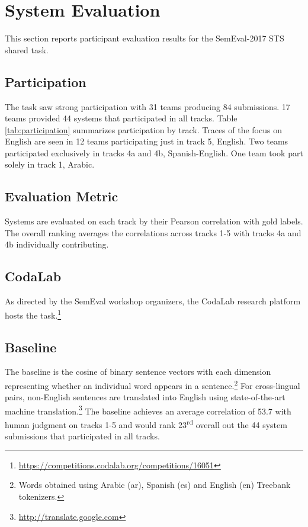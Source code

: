 \documentclass[11pt,a4paper]{article}
\begin{document}
\section{System Evaluation}

This section reports participant evaluation results for the SemEval-2017 STS shared task.

\subsection{Participation}

The task saw strong participation with 31 teams producing 84 submissions. 17 teams provided 44 systems that participated in all tracks. Table \ref{tab:participation} summarizes participation by track. Traces of the focus on English are seen in 12 teams participating just in track 5, English. Two teams participated exclusively in tracks 4a and 4b, Spanish-English. One team took part solely in track 1, Arabic.

\subsection{Evaluation Metric}

Systems are evaluated on each track by their Pearson correlation with gold labels. The overall ranking averages the correlations across tracks 1-5 with tracks 4a and 4b individually contributing.

\subsection{CodaLab}

As directed by the SemEval workshop organizers, the CodaLab research platform hosts the task.\footnote{\url{https://competitions.codalab.org/competitions/16051}}

\subsection{Baseline}
The baseline is the cosine of binary sentence vectors with each dimension representing whether an individual word appears in a sentence.\footnote{Words obtained using Arabic (ar), Spanish (es) and English (en) Treebank tokenizers.} For cross-lingual pairs, non-English sentences are translated into English using state-of-the-art machine translation.\footnote{\url{http://translate.google.com}} The baseline achieves an average correlation of 53.7 with human judgment on tracks 1-5 and would rank 23\textsuperscript{rd} overall out the 44 system submissions that participated in all tracks.
\end{document}
